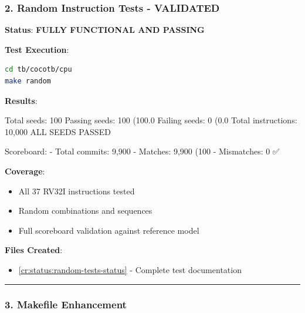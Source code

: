 \subsubsection{\texorpdfstring{2. \ok{} Random Instruction Tests -
VALIDATED}{2.  Random Instruction Tests - VALIDATED}}\label{cr:app:archive-session-summary:2-white-check-mark-random-instruction-tests-validated}

\begin{record}

\textbf{Status}: \textbf{FULLY FUNCTIONAL AND PASSING}

\textbf{Test Execution}:

\begin{lstlisting}[language=bash]
cd tb/cocotb/cpu
make random
\end{lstlisting}

\textbf{Results}:

\begin{textblock}
Total seeds:     100
Passing seeds:   100 (100.0%
Failing seeds:   0 (0.0%
Total instructions: 10,000
ALL SEEDS PASSED

Scoreboard:
- Total commits: 9,900
- Matches: 9,900 (100%
- Mismatches: 0 ✅
\end{textblock}

\textbf{Coverage}:

\begin{itemize}
\tightlist
\item
  All 37 RV32I instructions tested
\item
  Random combinations and sequences
\item
  Full scoreboard validation against reference model
\end{itemize}

\textbf{Files Created}:

\begin{itemize}
\tightlist
\item
  \cref{cr:status:random-tests-status} - Complete test documentation
\end{itemize}

\begin{center}\rule{0.5\linewidth}{0.5pt}\end{center}

\end{record}

\subsubsection{\texorpdfstring{3. \ok{} Makefile
Enhancement}{3.  Makefile Enhancement}}\label{cr:app:archive-session-summary:3-white-check-mark-makefile-enhancement}

